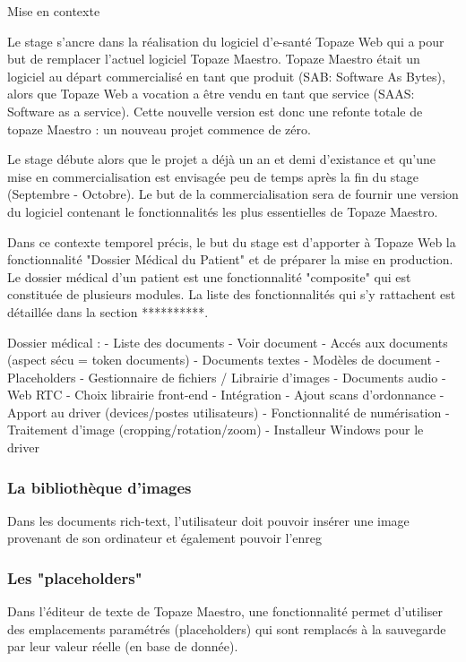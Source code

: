 Mise en contexte

Le stage s'ancre dans la réalisation du logiciel d'e-santé Topaze Web qui a pour but de remplacer l'actuel logiciel Topaze Maestro.
Topaze Maestro était un logiciel au départ commercialisé en tant que produit (SAB: Software As Bytes), alors que Topaze Web a vocation a être vendu en tant que service (SAAS: Software as a service).
Cette nouvelle version est donc une refonte totale de topaze Maestro : un nouveau projet commence de zéro.

Le stage débute alors que le projet a déjà un an et demi d'existance et qu'une mise en commercialisation est envisagée peu de temps après la fin du stage (Septembre - Octobre). Le but de la commercialisation sera de fournir une version du logiciel contenant le fonctionnalités les plus essentielles de Topaze Maestro. 

Dans ce contexte temporel précis, le but du stage est d'apporter à Topaze Web la fonctionnalité "Dossier Médical du Patient" et de préparer la mise en production.
Le dossier médical d'un patient est une fonctionnalité "composite" qui est constituée de plusieurs modules. La liste des fonctionnalités qui s'y rattachent est détaillée dans la section **********.



Dossier médical : 
	- Liste des documents
	- Voir document
		- Accés aux documents (aspect sécu = token documents)
	- Documents textes
		- Modèles de document
		- Placeholders
		- Gestionnaire de fichiers / Librairie d'images
	- Documents audio
		- Web RTC
		- Choix librairie front-end
		- Intégration
	- Ajout scans d'ordonnance
		- Apport au driver (devices/postes utilisateurs)
		- Fonctionnalité de numérisation
		- Traitement d'image (cropping/rotation/zoom)
	- Installeur Windows pour le driver		




\subsubsection{La bibliothèque d'images}
Dans les documents rich-text, l'utilisateur doit pouvoir insérer une image provenant de son ordinateur et également pouvoir l'enreg


\subsubsection{Les "placeholders"}
Dans l'éditeur de texte de Topaze Maestro, une fonctionnalité permet d'utiliser des emplacements paramétrés (placeholders) qui sont remplacés à la sauvegarde par leur valeur réelle (en base de donnée). \\

